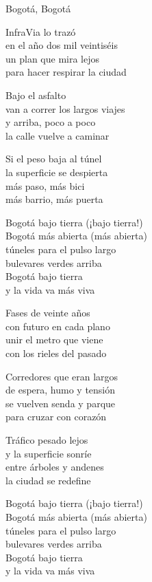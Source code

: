 \begin{lyrics}
Bogotá, Bogotá

InfraVia lo trazó\\
en el año dos mil veintiséis\\
un plan que mira lejos\\
para hacer respirar la ciudad

Bajo el asfalto\\
van a correr los largos viajes\\
y arriba, poco a poco\\
la calle vuelve a caminar

Si el peso baja al túnel\\
la superficie se despierta\\
más paso, más bici\\
más barrio, más puerta

Bogotá bajo tierra
(¡bajo tierra!)\\
Bogotá más abierta
(más abierta)\\
túneles para el pulso largo\\
bulevares verdes arriba\\
Bogotá bajo tierra\\
y la vida va más viva

Fases de veinte años\\
con futuro en cada plano\\
unir el metro que viene\\
con los rieles del pasado

Corredores que eran largos\\
de espera, humo y tensión\\
se vuelven senda y parque\\
para cruzar con corazón

Tráfico pesado lejos\\
y la superficie sonríe\\
entre árboles y andenes\\
la ciudad se redefine

Bogotá bajo tierra
(¡bajo tierra!)\\
Bogotá más abierta
(más abierta)\\
túneles para el pulso largo\\
bulevares verdes arriba\\
Bogotá bajo tierra\\
y la vida va más viva


\end{lyrics}
